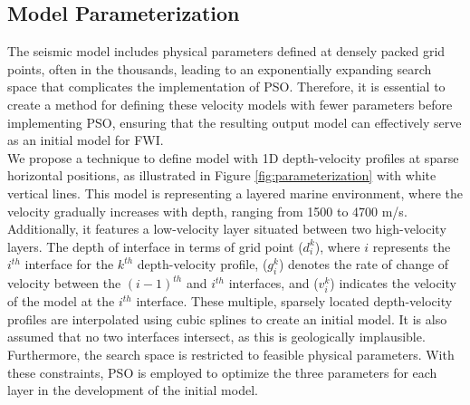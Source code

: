 \documentclass[paper,revised]{geophysics}
\begin{document}

\subsection{Model Parameterization}
The seismic model includes physical parameters defined at densely packed grid points, often in the thousands, leading to an exponentially expanding search space that complicates the implementation of PSO. Therefore, it is essential to create a method for defining these velocity models with fewer parameters before implementing PSO, ensuring that the resulting output model can effectively serve as an initial model for FWI. 
\\
We propose a technique to define model with 1D depth-velocity profiles at sparse horizontal positions, as illustrated in Figure \ref{fig:parameterization} with white vertical lines. This model is representing a layered marine environment, where the velocity gradually increases with depth, ranging from 1500 to 4700 m/s. Additionally, it features a low-velocity layer situated between two high-velocity layers. The depth of interface in terms of grid point (\(d_i^k\)), where \(i\) represents the \(i^{th}\) interface for the \(k^{th}\) depth-velocity profile, (\(g_i^k\)) denotes the rate of change of velocity between the \((i - 1)^{th}\) and \(i^{th}\) interfaces, and (\(v_i^k\)) indicates the velocity of the model at the \(i^{th}\) interface.  These multiple, sparsely located depth-velocity profiles are interpolated using cubic splines to create an initial model. It is also assumed that no two interfaces intersect, as this is geologically implausible. Furthermore, the search space is restricted to feasible physical parameters. With these constraints, PSO is employed to optimize the three parameters for each layer in the development of the initial model.

\end{document}
